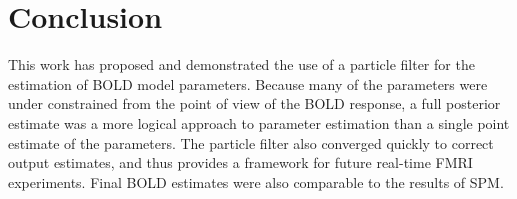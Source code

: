 \chapter{Conclusion}
\label{sec:Conclusion}
This work has proposed and demonstrated the use of a particle filter
for the estimation of BOLD model parameters. Because many of the parameters
were under constrained from the point of view of the BOLD response, a
full posterior estimate was a more logical approach to parameter estimation
than a single point estimate of the parameters. The particle filter also converged
quickly to correct output estimates, and thus provides a framework
for future real-time FMRI experiments. Final BOLD estimates were also comparable
to the results of SPM. 

